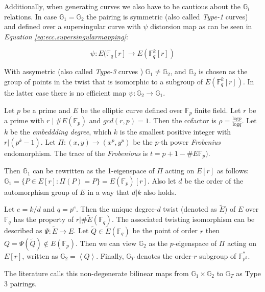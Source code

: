 Additionally, when generating curves we also have to be cautious about the $\mathbb{G}_i$ relations.
In case $\mathbb{G}_1 = \mathbb{G}_2$ the pairing is symmetric (also called \textit{Type-1} curves)
and defined over a supersingular curve with $\psi$ distorsion map
as can be seen in \textit{Equation \ref{eq:ecc.supersingularmapping}}\cite{ecc.fam.param}:

\begin{equation}
	\label{eq:ecc.supersingularmapping}
	\psi : E(\mathbb{F}_q[r] \rightarrow E(\mathbb{F}_q^k[r])
\end{equation}

With assymetric (also called \textit{Type-3} curves )
$\mathbb{G}_1 \neq \mathbb{G}_2$, and $\mathbb{G}_2$ is chosen
as the group of points in the twist that is isomorphic to a subgroup
of $E(\mathbb{F}_q^k[r])$. In the latter case there is no efficient
map $\psi : \mathbb{G}_2 \rightarrow \mathbb{G}_1$. \cite{ecc.fam.param}


Let $p$ be a prime and $E$ be the elliptic curve defined over $\mathbb{F}_p$ finite field. Let $r$ be a prime with $r \mid \# E(\mathbb{F}_p)$ and $gcd(r,p)=1$. Then the cofactor is $\rho = \frac{\mathrm{log} p}{\mathrm{log} q}$.
Let $k$ be the \textit{embeddding degree}, which $k$ is the smallest positive integer
with $r | (p^k -1)$. Let $\Pi: (x,y) \rightarrow  (x^p,y^p) $ be the $p$-th
power \textit{Frobenius} endomorphism. The trace of the \textit{Frobenious} is
$t = p+1 - \#E\mathbb{F}_p)$.\cite{ecc.pairings.param}

Then $\mathbb{G}_1$ can be rewritten as the 1-eigenspace of $\Pi$ acting
on $E[r]$ as follows: $\mathbb{G}_1 = \{ P \in E[r]: \Pi(P) = P\} = E(\mathbb{F}_p)[r]$.
Also let $d$ be the order of the automorphism group of $E$ in a way that $d | k$ also holds.\cite{ecc.pairings.param}

Let $e = k/d$ and $q=p^e$. Then the unique degree-$d$ twist (denoted as $\tilde{E}$) of $E$ over
$\mathbb{F}_q$ has the property of $r | \# \tilde{E} (\mathbb{F}_q)$. The associated
twisting isomorphism can be described as $\Psi: \tilde{E} \rightarrow E$. Let $\tilde{Q} \in \tilde{E}(\mathbb{F}_q)$
be the point of order $r$ then $Q = \Psi (\tilde{Q}) \notin E(\mathbb{F}_p)$. Then we
can view $\mathbb{G}_2$ as the $p$-eigenspace of $\Pi$ acting on $E[r]$, written as
$\mathbb{G}_2 = \left< Q \right>$. Finally, $\mathbb{G}_T$ denotes the order-$r$ subgroup
of $\mathbb{F}^*_{p^k}$.\cite{ecc.pairings.param}

The literature calls this non-degenerate bilinear maps from $\mathbb{G}_1 \times \mathbb{G}_2$
to $\mathbb{G}_T$ as Type 3 pairings. \cite{ecc.pairings.param} 

